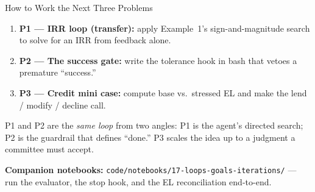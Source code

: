 \documentclass[9pt,t]{beamer}
\begin{document}
\begin{frame}{How to Work the Next Three Problems}

\begin{enumerate}
  \item \textbf{P1 --- IRR loop (transfer):} apply Example~1's sign-and-magnitude
        search to solve for an IRR from feedback alone.
  \item \textbf{P2 --- The success gate:} write the tolerance hook in bash that
        vetoes a premature ``success.''
  \item \textbf{P3 --- Credit mini case:} compute base vs.\ stressed EL and make
        the lend / modify / decline call.
\end{enumerate}

\medskip
\begin{bigpicture}
P1 and P2 are the \emph{same loop} from two angles: P1 is the agent's directed
search; P2 is the guardrail that defines ``done.'' P3 scales the idea up to a
judgment a committee must accept.
\end{bigpicture}

\medskip
\textbf{Companion notebooks:} \texttt{code/notebooks/17-loops-goals-iterations/}
--- run the evaluator, the stop hook, and the EL reconciliation end-to-end.
\end{frame}
\end{document}
